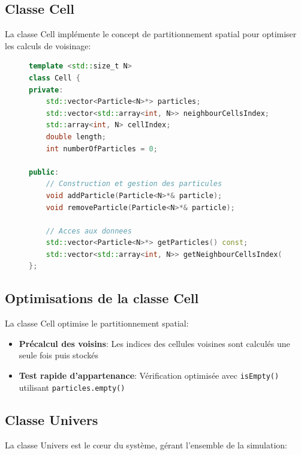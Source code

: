 \documentclass[12pt,a4paper]{article}
\begin{document}
\subsection{Classe Cell}

La classe Cell implémente le concept de partitionnement spatial pour optimiser les calculs de voisinage:

\begin{figure}[H]
\begin{lstlisting}[language=C++, caption=Extrait de la classe Cell]
template <std::size_t N>
class Cell {
private:
    std::vector<Particle<N>*> particles;
    std::vector<std::array<int, N>> neighbourCellsIndex;
    std::array<int, N> cellIndex;
    double length;
    int numberOfParticles = 0;

public:
    // Construction et gestion des particules
    void addParticle(Particle<N>*& particle);
    void removeParticle(Particle<N>*& particle);
    
    // Acces aux donnees
    std::vector<Particle<N>*> getParticles() const;
    std::vector<std::array<int, N>> getNeighbourCellsIndex() const;
};
\end{lstlisting}
\end{figure}

\subsection{Optimisations de la classe Cell}

La classe Cell optimise le partitionnement spatial:

\begin{itemize}
    \item \textbf{Précalcul des voisins}: Les indices des cellules voisines sont calculés une seule fois puis stockés
    \item \textbf{Test rapide d'appartenance}: Vérification optimisée avec \texttt{isEmpty()} utilisant \texttt{particles.empty()}
\end{itemize}

\subsection{Classe Univers}

La classe Univers est le cœur du système, gérant l'ensemble de la simulation:
\end{document}
